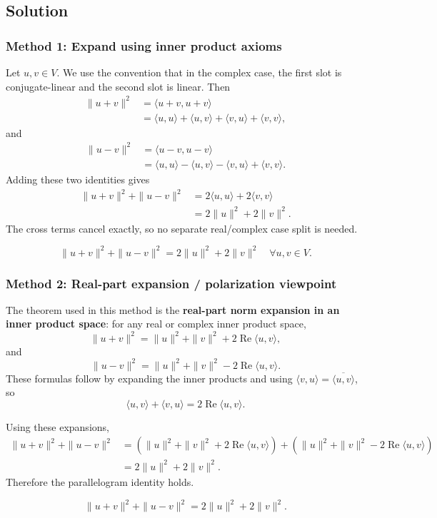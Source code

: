 \documentclass[12pt]{article}
\begin{document}
\vspace{2cm}

\subsection{Solution}

\subsubsection{Method 1: Expand using inner product axioms}
Let $u,v\in V$. We use the convention that in the complex case, the first slot is conjugate-linear and the second slot is linear. Then
\begin{align*}
\|u+v\|^2
&=\langle u+v,u+v\rangle\\
&=\langle u,u\rangle+\langle u,v\rangle+\langle v,u\rangle+\langle v,v\rangle,
\end{align*}
and
\begin{align*}
\|u-v\|^2
&=\langle u-v,u-v\rangle\\
&=\langle u,u\rangle-\langle u,v\rangle-\langle v,u\rangle+\langle v,v\rangle.
\end{align*}
Adding these two identities gives
\begin{align*}
\|u+v\|^2+\|u-v\|^2
&=2\langle u,u\rangle+2\langle v,v\rangle\\
&=2\|u\|^2+2\|v\|^2.
\end{align*}
The cross terms cancel exactly, so no separate real/complex case split is needed.

\[
\boxed{\,\|u+v\|^2+\|u-v\|^2=2\|u\|^2+2\|v\|^2\quad\forall u,v\in V.\,}
\]

\newpage
\subsubsection{Method 2: Real-part expansion / polarization viewpoint}
The theorem used in this method is the \textbf{real-part norm expansion in an inner product space}: for any real or complex inner product space,
\[
\|u+v\|^2=\|u\|^2+\|v\|^2+2\operatorname{Re}\langle u,v\rangle,
\]
and
\[
\|u-v\|^2=\|u\|^2+\|v\|^2-2\operatorname{Re}\langle u,v\rangle.
\]
These formulas follow by expanding the inner products and using $\langle v,u\rangle=\overline{\langle u,v\rangle}$, so
\[
\langle u,v\rangle+\langle v,u\rangle=2\operatorname{Re}\langle u,v\rangle.
\]

Using these expansions,
\begin{align*}
\|u+v\|^2+\|u-v\|^2
&=\left(\|u\|^2+\|v\|^2+2\operatorname{Re}\langle u,v\rangle\right)
+\left(\|u\|^2+\|v\|^2-2\operatorname{Re}\langle u,v\rangle\right)\\
&=2\|u\|^2+2\|v\|^2.
\end{align*}
Therefore the parallelogram identity holds.

\[
\boxed{\,\|u+v\|^2+\|u-v\|^2=2\|u\|^2+2\|v\|^2.\,}
\]
\end{document}

